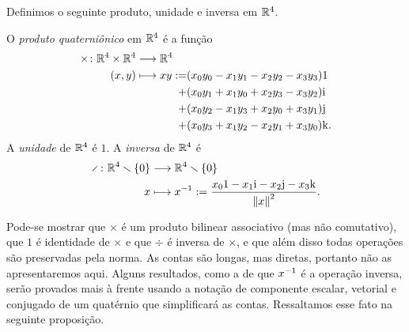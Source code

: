 Definimos o seguinte produto, unidade e inversa em $\mathbb{R}^4$.

\begin{definition}
O \emph{produto quaterniônico} em $\mathbb{R}^4$ é a função
	\begin{align*}
	\func{\times}{\R^4 \times \R^4}{\R^4}{(x,y)}{
		\begin{aligned}[t]
		xy := &(x_0y_0 - x_1y_1 - x_2y_2 - x_3y_3) 1 \\
			+ &(x_0y_1 + x_1y_0 + x_2y_3 - x_3y_2) \ii \\
			+ &(x_0y_2 - x_1y_3 + x_2y_0 + x_3y_1) \jj \\
			+ &(x_0y_3 + x_1y_2 - x_2y_1 + x_3y_0) \kk .
		\end{aligned}
	}
	\end{align*}
A \emph{unidade} de $\mathbb{R}^4$ é $1$. A \emph{inversa} de $\mathbb{R}^4$ é
	\begin{align*}
	\func{\div}{\R^4 \setminus \{0\}}{\R^4 \setminus \{0\}}{x}{x\inv := \frac{x_0 1 - x_1 \ii - x_2 \jj - x_3 \kk}{\nor{x}^2}}.
	\end{align*}
\end{definition}

Pode-se mostrar que $\times$ é um produto bilinear associativo (mas não comutativo), que $1$ é identidade de $\times$ e que $\div$ é inversa de $\times$, e que além disso todas operações são preservadas pela norma. As contas são longas, mas diretas, portanto não as apresentaremos aqui. Alguns resultados, como a de que $x^{-1}$ é a operação inversa, serão provados mais à frente usando a notação de componente escalar, vetorial e conjugado de um quatérnio que simplificará as contas. Ressaltamos esse fato na seguinte proposição.

